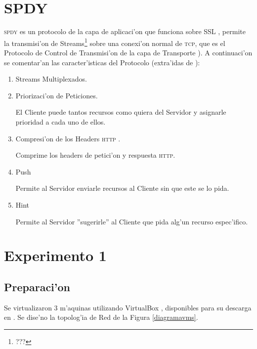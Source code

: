 \documentclass[a4paper,11pt,twocolumn]{article}
\begin{document}
\section{SPDY}

\textsc{spdy}\cite{SPDYWhitepaper} es un protocolo de la capa de aplicaci'on \cite{illustratedTCPIP} que funciona sobre SSL \cite{rfcSSL}, permite la transmisi'on de Streams\footnote{???} sobre una conexi'on normal de \textsc{tcp}, que es el Protocolo de Control de Transmisi'on de la capa de Transporte \cite{illustratedTCPIP}). A continuaci'on se comentar'an las caracter'isticas del Protocolo (extra'idas de \cite{SPDYWhitepaper}):

\begin{enumerate}

\item Streams Multiplexados.

\item Priorizaci'on de Peticiones.

El Cliente puede tantos recursos como quiera del Servidor y asignarle prioridad a cada uno de ellos.

\item Compresi'on de los Headers \textsc{http} \cite{headersHTTP}.

Comprime los headers de petici'on y respuesta \textsc{http}.

\item Push

Permite al Servidor enviarle recursos al Cliente sin que este se lo pida.

\item Hint

Permite al Servidor ''sugerirle'' al Cliente que pida alg'un recurso espec'ifico.

\end{enumerate}

\section{Experimento 1}
\label{experimento1}
\subsection{Preparaci'on}

Se virtualizaron 3 m'aquinas utilizando VirtualBox \cite{virtualBox}, disponibles para su descarga en \cite{maqVirtuales}.
Se dise'no la topolog'ia de Red de la Figura \ref{diagramavms}.
\end{document}
